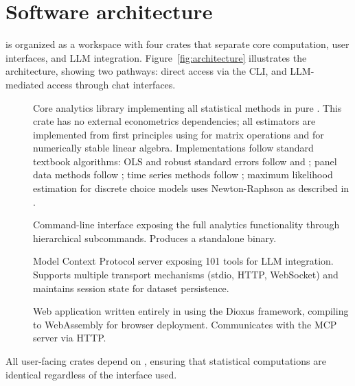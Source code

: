 
\section{Software architecture} \label{sec:architecture}

 is organized as a  workspace with
four crates that separate core computation, user interfaces,
and LLM integration. Figure~\ref{fig:architecture} illustrates the
architecture, showing two pathways: direct access via the CLI, and
LLM-mediated access through chat interfaces.

\begin{description}
  \item[] Core analytics library implementing all statistical
    methods in pure . This crate has no external econometrics
    dependencies; all estimators are implemented from first principles using
     for matrix operations and  for numerically stable
    linear algebra. Implementations follow standard textbook algorithms:
    OLS and robust standard errors follow \cite{Wooldridge:2010} and
    \cite{Cameron+Trivedi:2005}; panel data methods follow \cite{Baltagi:2013};
    time series methods follow \cite{Hamilton:1994}; maximum likelihood
    estimation for discrete choice models uses Newton-Raphson as described
    in \cite{Greene:2018}.
  \item[] Command-line interface exposing the full analytics
    functionality through hierarchical subcommands. Produces a standalone
     binary.
  \item[] Model Context Protocol server exposing 101 tools for
    LLM integration. Supports multiple transport mechanisms (stdio, HTTP,
    WebSocket) and maintains session state for dataset persistence.
  \item[] Web application written entirely in 
    using the Dioxus framework, compiling to WebAssembly for browser deployment.
    Communicates with the MCP server via HTTP.
\end{description}

All user-facing crates depend on , ensuring that statistical
computations are identical regardless of the interface used.

